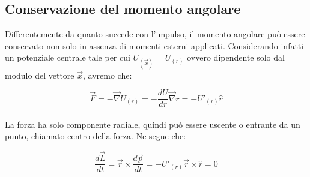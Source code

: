 \subsection{Conservazione del momento angolare}
Differentemente da quanto succede con l'impulso, il momento angolare può essere
conservato non solo in assenza di momenti esterni applicati.
Considerando infatti un potenziale centrale tale per cui $U_{(\vec x)} = U_{(r)}$
ovvero dipendente solo dal modulo del vettore $\vec x$, avremo che:

\begin{equation}
    \vec F = -\vec\nabla U_{(r)} = -\frac{dU}{dr}\vec\nabla r = -U'_{(r)}\hat r
\end{equation}
\\
La forza ha solo componente radiale, quindi può essere uscente o entrante da un
punto, chiamato centro della forza. Ne segue che:

\begin{equation}
    \frac{d\vec L}{dt} = \vec r\times\frac{d\vec p}{dt} = -U'_{(r)}\vec r\times\hat r = 0
\end{equation}